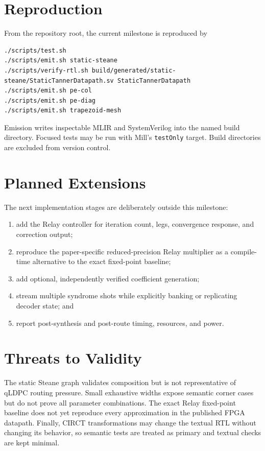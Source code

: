 \documentclass[10pt,conference]{IEEEtran}
\begin{document}
\section{Reproduction}
From the repository root, the current milestone is reproduced by
\begin{verbatim}
./scripts/test.sh
./scripts/emit.sh static-steane
./scripts/verify-rtl.sh build/generated/static-steane/StaticTannerDatapath.sv StaticTannerDatapath
./scripts/emit.sh pe-col
./scripts/emit.sh pe-diag
./scripts/emit.sh trapezoid-mesh
\end{verbatim}
Emission writes inspectable MLIR and SystemVerilog into the named build
directory.  Focused tests may be run with Mill's \texttt{testOnly} target.
Build directories are excluded from version control.

\section{Planned Extensions}
The next implementation stages are deliberately outside this milestone:
\begin{enumerate}
  \item add the Relay controller for iteration count, legs, convergence
        response, and correction output;
  \item reproduce the paper-specific reduced-precision Relay multiplier as a
        compile-time alternative to the exact fixed-point baseline;
  \item add optional, independently verified coefficient generation;
  \item stream multiple syndrome shots while explicitly banking or replicating
        decoder state; and
  \item report post-synthesis and post-route timing, resources, and power.
\end{enumerate}

\section{Threats to Validity}
The static Steane graph validates composition but is not representative of
qLDPC routing pressure.  Small exhaustive widths expose semantic corner cases but do
not prove all parameter combinations.  The exact Relay fixed-point baseline
does not yet reproduce every approximation in the published FPGA datapath.
Finally, CIRCT transformations may change the textual RTL without changing its
behavior, so semantic tests are treated as primary and textual checks are kept
minimal.
\end{document}
